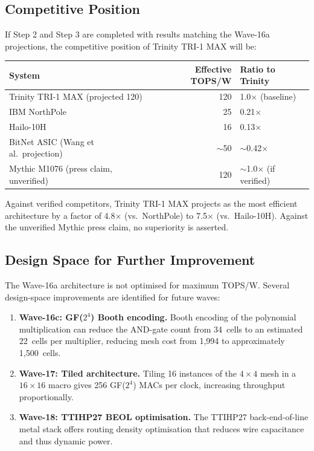 \subsection{Competitive Position}

If Step 2 and Step 3 are completed with results matching the Wave-16a
projections, the competitive position of Trinity TRI-1 MAX will be:

\begin{center}
\begin{tabular}{lrl}
\toprule
\textbf{System} & \textbf{Effective TOPS/W} & \textbf{Ratio to Trinity} \\
\midrule
Trinity TRI-1 MAX (projected 120) & 120 & 1.0\(\times\) (baseline) \\
IBM NorthPole & 25 & 0.21\(\times\) \\
Hailo-10H & 16 & 0.13\(\times\) \\
BitNet ASIC (Wang et al.\ projection) & $\sim$50 & $\sim$0.42\(\times\) \\
Mythic M1076 (press claim, unverified) & 120 & $\sim$1.0\(\times\) (if verified) \\
\bottomrule
\end{tabular}
\end{center}

Against verified competitors, Trinity TRI-1 MAX projects as the most
efficient architecture by a factor of 4.8\(\times\) (vs.\ NorthPole) to
7.5\(\times\) (vs.\ Hailo-10H).
Against the unverified Mythic press claim, no superiority is asserted.

\subsection{Design Space for Further Improvement}

The Wave-16a architecture is not optimised for maximum TOPS/W.
Several design-space improvements are identified for future waves:

\begin{enumerate}
  \item \textbf{Wave-16c: GF(\(2^4\)) Booth encoding.}
        Booth encoding of the polynomial multiplication can reduce the
        AND-gate count from 34~cells to an estimated 22~cells per multiplier,
        reducing mesh cost from 1,994 to approximately 1,500~cells.
  \item \textbf{Wave-17: Tiled architecture.}
        Tiling 16 instances of the \(4 \times 4\) mesh in a \(16 \times 16\)
        macro gives 256 GF(\(2^4\)) MACs per clock, increasing throughput
        proportionally.
  \item \textbf{Wave-18: TTIHP27 BEOL optimisation.}
        The TTIHP27 back-end-of-line metal stack offers routing density
        optimisation that reduces wire capacitance and thus dynamic power.
\end{enumerate}

